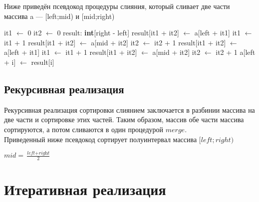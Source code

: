 Ниже приведён псевдокод процедуры слияния, который сливает две части массива a
— [left;mid)
и [mid;right)

\begin{algorithmic}[1]
        \State it1 $\gets$ 0
        \State it2 $\gets$ 0
        \State result: \textbf{int}[right - left]
                \State result[it1 + it2] $\gets$ a[left + it1]
                \State it1 $\gets$ it1 + 1
            \Else
                \State result[it1 + it2] $\gets$ a[mid + it2]
                \State it2 $\gets$ it2 + 1
            \EndIf
        \EndWhile
            \State result[it1 + it2] $\gets$ a[left + it1]
            \State it1 $\gets$ it1 + 1
        \EndWhile
            \State result[it1 + it2] $\gets$ a[mid + it2]
            \State it2 $\gets$ it2 + 1
        \EndWhile
            \State a[left + i] $\gets$ result[i]
        \EndFor
    \EndFunction
\end{algorithmic}

\subsection{Рекурсивная реализация}
Рекурсивная реализация сортировки слиянием заключается в разбинии массива на две части и сортировке этих частей.
Таким образом, массив обе части массива сортируются, а потом сливаются в один процедурой $merge$.\\
Приведенный ниже псевдокод сортирует полуинтервал массива $[left; right)$
\\
\begin{algorithmic}[1]
            \State \Return
        \EndIf
        \State $\textit{mid} = \frac{\textit{left} + \textit{right}}{2}$
        \State {}
        \State {}
        \State {}
    \EndFunction
\end{algorithmic}


\section{Итеративная реализация}



